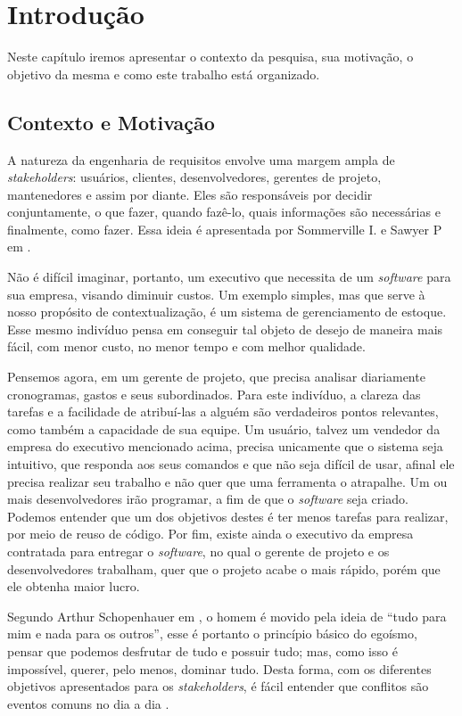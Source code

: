 \chapter{Introdução} \label{cap:introducao}

Neste capítulo iremos apresentar o contexto da pesquisa, sua motivação, o
objetivo da mesma e como este trabalho está organizado.

\section{Contexto e Motivação}
 
A natureza da engenharia de requisitos envolve uma margem ampla de
\textit{stakeholders}: usuários, clientes, desenvolvedores, gerentes de projeto,
mantenedores e assim por diante.  Eles são responsáveis por decidir conjuntamente, o que fazer, quando fazê-lo, quais informações são necessárias e finalmente,
como fazer. Essa ideia é apresentada por Sommerville I. e Sawyer P
em \cite{Sommerville:1997:REG:549198}.

Não é difícil imaginar, portanto, um
executivo que necessita de um \textit{software} para sua empresa, visando diminuir custos. Um exemplo simples, mas que serve à nosso propósito de contextualização, é um sistema de gerenciamento
de estoque. Esse mesmo indivíduo pensa em conseguir tal objeto de desejo de
maneira mais fácil, com menor custo, no menor tempo e com melhor qualidade.

Pensemos agora, em um gerente de projeto, que
precisa analisar diariamente cronogramas, gastos e seus subordinados. Para este
indivíduo, a clareza das tarefas e a facilidade de atribuí-las a alguém são
verdadeiros pontos relevantes, como também a capacidade de sua equipe.
Um usuário, talvez um vendedor da empresa do executivo
mencionado acima, precisa unicamente que o sistema seja intuitivo, que responda
aos seus comandos e que não seja difícil de usar, afinal ele precisa realizar
seu trabalho e não quer que uma ferramenta o atrapalhe.
Um ou mais desenvolvedores irão programar, a fim de que o \textit{software} seja criado.
Podemos entender que um dos objetivos destes é ter menos tarefas para realizar,
por meio de reuso de código.
Por fim, existe ainda o executivo da empresa contratada para entregar o
\textit{software}, no qual o gerente de projeto e os desenvolvedores trabalham,
quer que o projeto acabe o mais rápido, porém que ele obtenha maior lucro.

Segundo Arthur Schopenhauer em \cite{as1860}, o homem é movido pela ideia de
``tudo para mim e nada para os outros'', esse é portanto o princípio básico do
egoísmo, pensar que podemos desfrutar de tudo e possuir tudo; mas, como isso é
impossível, querer, pelo menos, dominar tudo. Desta forma, com os diferentes
objetivos apresentados para os \textit{stakeholders}, é fácil entender que
conflitos são eventos comuns no dia a dia \cite{Barki:2001:ICM:2017138.2017142}.

